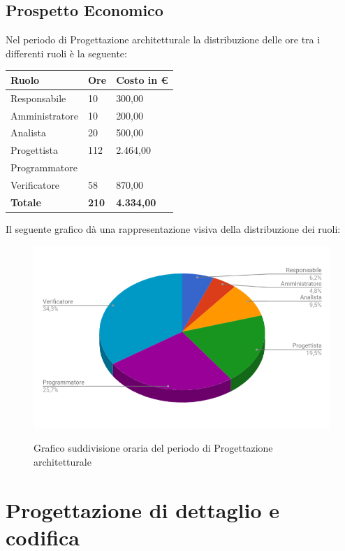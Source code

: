 \documentclass[PianoDiProgetto.tex]{subfiles}
\begin{document}
\subsection{Prospetto Economico}
Nel periodo di Progettazione architetturale la distribuzione delle ore tra i differenti ruoli è la seguente:
\begin{table}[htbp]
	\centering
	\renewcommand\arraystretch{1.5}
	\begin{tabularx}{\textwidth}{p{5cm}|p{4cm}|p{4cm}}
		\hline
		\textbf{Ruolo} & \textbf{Ore} & \textbf{Costo in \euro} \\
		\hline
		Responsabile & 10 & 300,00 \\
		\hline
		Amministratore & 10 & 200,00 \\
		\hline
		Analista & 20 & 500,00 \\
		\hline
		Progettista & 112 & 2.464,00 \\
		\hline
		Programmatore & \ & \ \\
		\hline
		Verificatore & 58 & 870,00 \\
		\hline
		\textbf{Totale} & \textbf{210} & \textbf{4.334,00}\\
		\hline
	\end{tabularx}
\end{table}
\newpage
Il seguente grafico dà una rappresentazione visiva della distribuzione dei ruoli:
\begin{figure}
	\includegraphics[width=14.5cm]{images/prospettoEconomico/progArch.png}
	\label{fig:foo}
	\caption{Grafico suddivisione oraria del periodo di Progettazione architetturale}
\end{figure} 
\newpage
\section{Progettazione di dettaglio e codifica}
\end{document}
